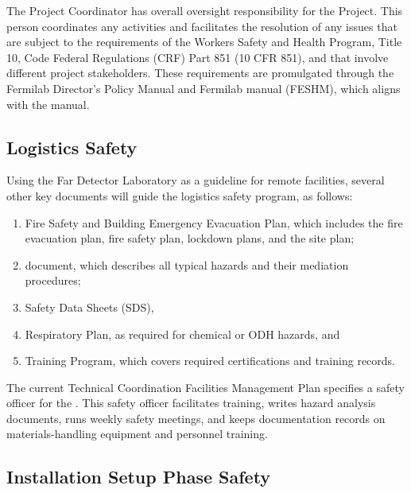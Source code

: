 The  Project  Coordinator has overall  oversight responsibility for the  Project.  This person coordinates any  activities and facilitates the resolution of any issues that are subject to the requirements of the  Workers Safety and Health Program, Title 10, Code Federal Regulations (CRF) Part 851 (10 CFR 851), and that involve different project stakeholders. These requirements are promulgated through the Fermilab Director's Policy Manual  and Fermilab  manual (FESHM\cite{feshm}), which aligns with the   manual.  

\subsection{Logistics Safety}


Using the  Far Detector Laboratory as a guideline for remote facilities, several other key documents will guide the  logistics safety program, as follows:

\begin{enumerate}
\item	Fire Safety and Building Emergency Evacuation Plan, which includes the fire evacuation plan, fire safety plan, lockdown plans, and the site plan;
\item	{} document, which describes all typical hazards and their mediation procedures; 
\item	Safety Data Sheets (SDS), 
\item	Respiratory Plan, as required for chemical or ODH hazards, and 
\item	Training Program, which covers required certifications and  training records.
\end{enumerate}

The current Technical Coordination Facilities Management Plan  specifies a safety officer for the  . This safety officer facilitates training, writes hazard analysis documents, runs weekly safety meetings, and keeps documentation records on materials-handling equipment and personnel training.

\subsection{Installation Setup Phase Safety}
\label{sec:fdsp-tc-infr-safety}

